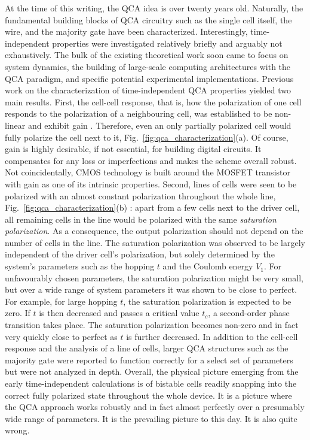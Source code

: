 At the time of this writing, the QCA idea is over twenty years old. Naturally,
the fundamental building blocks of QCA circuitry such as the single cell itself,
the wire, and the majority gate have been characterized. Interestingly,
time-independent properties were investigated relatively briefly and arguably
not exhaustively. The bulk of the existing theoretical work soon came to focus
on system dynamics, the building of large-scale computing architectures with the
QCA paradigm, and specific potential experimental implementations. Previous work
on the characterization of time-independent QCA properties yielded two main
results. First, the cell-cell response, that is, how the polarization of one
cell responds to the polarization of a neighbouring cell, was established to be
non-linear and exhibit gain \cite{lent1993quantum}. Therefore, even an only
partially polarized cell would fully polarize the cell next to it,
Fig.~\ref{fig:qca_characterization}(a). Of course, gain is highly desirable,
if not essential, for building digital circuits. It compensates for any loss or
imperfections and makes the scheme overall robust. Not coincidentally, CMOS
technology is built around the MOSFET transistor with gain as one of its
intrinsic properties. Second, lines of cells were seen to be polarized with an
almost constant polarization throughout the whole line,
Fig.~\ref{fig:qca_characterization}(b) \cite{lent1993lines}: apart from a few
cells next to the driver cell, all remaining cells in the line would be
polarized with the same \emph{saturation polarization}. As a consequence, the
output polarization should not depend on the number of cells in the line. The
saturation polarization was observed to be largely independent of the driver
cell's polarization, but solely determined by the system's parameters such as
the hopping $t$ and the Coulomb energy $V_1$. For unfavourably chosen
parameters, the saturation polarization might be very small, but over a wide
range of system parameters it was shown to be close to perfect. For example, for
large hopping $t$, the saturation polarization is expected to be zero. If $t$ is
then decreased and passes a critical value $t_c$, a second-order phase
transition takes place. The saturation polarization becomes non-zero and in
fact very quickly close to perfect as $t$ is further decreased. In addition to
the cell-cell response and the analysis of a line of cells, larger QCA
structures such as the majority gate were reported to function correctly for a
select set of parameters but were not analyzed in depth. Overall, the physical
picture emerging from the early time-independent calculations is of bistable
cells readily snapping into the correct fully polarized state throughout the
whole device. It is a picture where the QCA approach works robustly and in fact
almost perfectly over a presumably wide range of parameters. It is the
prevailing picture to this day. It is also quite wrong.

